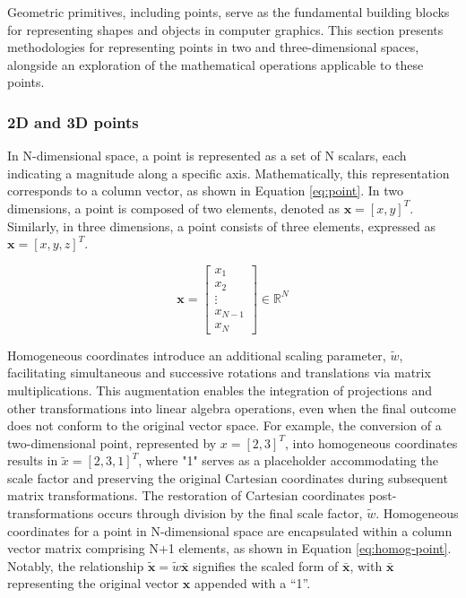 Geometric primitives, including points, serve as the fundamental building blocks for representing shapes and objects in computer graphics.
This section presents methodologies for representing points in two and three-dimensional spaces, alongside an exploration of the mathematical operations applicable to these points.

\subsubsection{2D and 3D points}
\label{sec:geometric-points}
In N-dimensional space, a point is represented as a set of N scalars, each indicating a magnitude along a specific axis.
Mathematically, this representation corresponds to a column vector, as shown in Equation \ref{eq:point}.
In two dimensions, a point is composed of two elements, denoted as $\mathbf{x} = [x , y]^{T}$.
Similarly, in three dimensions, a point consists of three elements, expressed as $\mathbf{x} = [x , y , z]^{T}$.

\begin{equation}
    \mathbf{x} = \begin{bmatrix}
        x_1 \\ x_2 \\ \vdots \\ x_{N-1} \\ x_N
    \end{bmatrix} \in \mathbb{R}^N
    \label{eq:point}
\end{equation}


Homogeneous coordinates introduce an additional scaling parameter, $\tilde{w}$, facilitating simultaneous and successive rotations and translations via matrix multiplications.
This augmentation enables the integration of projections and other transformations into linear algebra operations, even when the final outcome does not conform to the original vector space.
For example, the conversion of a two-dimensional point, represented by $x = [2,3]^{T}$, into homogeneous coordinates results in $\tilde{x} = [2,3,1]^{T}$, where "1" serves as a placeholder accommodating the scale factor and preserving the original Cartesian coordinates during subsequent matrix transformations.
The restoration of Cartesian coordinates post-transformations occurs through division by the final scale factor, $\tilde{w}$.
Homogeneous coordinates for a point in N-dimensional space are encapsulated within a column vector matrix comprising N+1 elements, as shown in Equation \ref{eq:homog-point}.
Notably, the relationship $\mathbf{\tilde{x}} = \tilde{w}\mathbf{\bar{x}}$ signifies the scaled form of $\bar{\mathbf{x}}$, with $\bar{\mathbf{x}}$ representing the original vector $\mathbf{x}$ appended with a ``1''.

